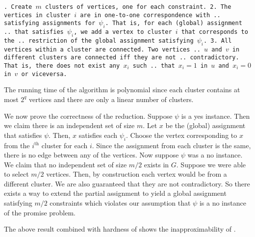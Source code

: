 \documentclass[11pt]{article}
\begin{document}
\medskip
{\tt \obeylines {}. Create $m$ clusters of vertices, one for each constraint. 
2. The vertices in cluster $i$ are in one-to-one correspondence with
.. satisfying assignments for $\psi_{i}$. That is, for each (global) assignment 
.. that satisfies $\psi_{i}$, we add a vertex to cluster $i$ that corresponds to the 
.. restriction of the global assignment satisfying $\psi_{i}$.
3. All vertices within a cluster are connected. Two vertices 
.. $u$ and $v$ in different clusters are connected iff they are not 
.. contradictory. That is, there does not exist any $x_i$ such 
.. that $x_i = 1$ in $u$ and $x_i = 0$ in $v$ or viceversa.
}
\medskip

The running time of the algorithm is polynomial since each cluster contains at most 
$2^q$ vertices and there are only a linear number of clusters.

We now prove the correctness of the reduction. Suppose $\psi$ is a yes instance. 
Then we claim there is an independent set of size $m$. Let $x$ be the (global) assignment 
that satisfies $\psi$. Then, $x$ satisfies each $\psi_{i}$. Choose the vertex 
corresponding to $x$ from the $i^\textrm{th}$ cluster for each $i$. Since the assignment from 
each cluster is the same, there is no edge between any of the vertices. Now suppose $\psi$ was a 
no instance. We claim that no independent set of size $m/2$ exists in $G$. Suppose we were able to 
select $m/2$ vertices. Then, by construction each vertex would be from a different cluster. We are 
also guaranteed that they are not contradictory. So there exists a way to extend the partial 
assignment to yield a global assignment satisfying $m/2$ constraints which violates our assumption 
that $\psi$ is a no instance of the promise problem.

The above result combined with hardness of  shows the inapproximability of .
\end{document}
